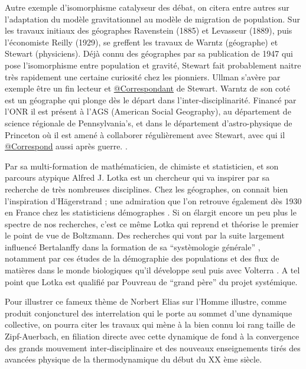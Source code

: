 {Autre exemple d'isomorphisme catalyseur des débat, on citera entre autres sur l'adaptation du modèle gravitationnel au modèle de migration de population. Sur les travaux initiaux des géographes Ravenstein (1885) et Levasseur (1889), puis l'économiste Reilly (1929), se greffent les travaux de Warntz (géographe) et Stewart (physiciens). Déjà connu des géographes par sa publication de 1947 qui pose l'isomorphisme entre population et gravité, Stewart fait probablement naitre très rapidement une certaine curiosité chez les pionniers. Ullman s'avère par exemple être un fin lecteur \autocite[61]{Glick1988} et \href{http://nwda.orbiscascade.org/ark:/80444/xv01385}{@Correspondant} de Stewart. Warntz de son coté est un géographe qui plonge dès le départ dans l'inter-disciplinarité. Financé par l'ONR il est présent à l'AGS (American Social Geography), au département de science régionale de Pennsylvania's, et dans le département d'astro-physique de Princeton où il est amené à collaborer régulièrement avec Stewart, avec qui il \href{http://rmc.library.cornell.edu/EAD/htmldocs/RMM04392.html}{@Correspond} aussi après guerre. \autocite{Barnes2006}. 

Par sa multi-formation de mathématicien, de chimiste et statisticien, et son parcours atypique Alfred J. Lotka est un chercheur qui va inspirer par sa recherche de très nombreuses disciplines. Chez les géographes, on connait bien l'inspiration d'Hägerstrand \autocite[95]{Claval2007} ; une admiration que l'on retrouve également dès 1930 en France chez les statisticiens démographes \autocite{Veron2009}. Si on élargit encore un peu plus le spectre de nos recherches, c'est ce même Lotka qui reprend et théorise le premier le point de vue de Boltzmann. Des recherches qui vont par la suite largement influencé Bertalanffy dans la formation de sa \enquote{systèmologie générale} \autocite[178]{Pouvreau2013}, notamment par ces études de la démographie des populations et des flux de matières dans le monde biologiques qu'il développe seul puis  avec Volterra \autocite[545-546]{Pouvreau2013}. A tel point que Lotka est qualifié par Pouvreau de \enquote{grand père} du projet systémique.

Pour illustrer ce fameux thème de Norbert Elias \autocite[31-33]{Delmotte2010} \textcite{Elias1991} sur l'Homme illustre, comme produit conjoncturel des interrelation qui le porte au sommet d'une dynamique collective, on pourra citer les travaux qui mène à la bien connu loi rang taille de Zipf-Auerbach, en filiation directe avec cette dynamique de fond à la convergence des grands mouvement inter-disciplinaire et des nouveaux enseignements tirés des avancées physique de la thermodynamique du début du XX ème siècle.

}
